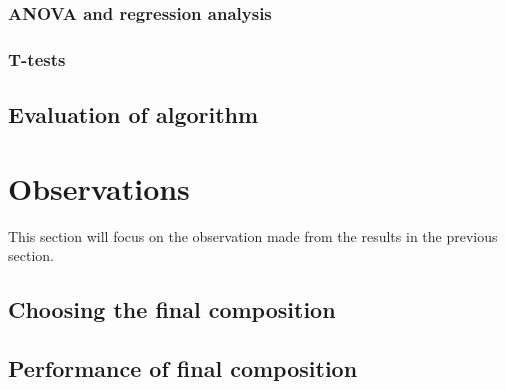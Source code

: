 \documentclass[../main.tex]{subfiles}
\begin{document}
\subsubsection{ANOVA and regression analysis}

\subsubsection{T-tests}

\subsection{Evaluation of algorithm}
\label{sec:evala}

\section{Observations}
\label{sec:obs}
This section will focus on the observation made from the results in the previous section.

\subsection{Choosing the final composition}
\label{sec:choosing}

\subsection{Performance of final composition}
\label{sec:fincomp}

\biblio                                                         
\end{document}
